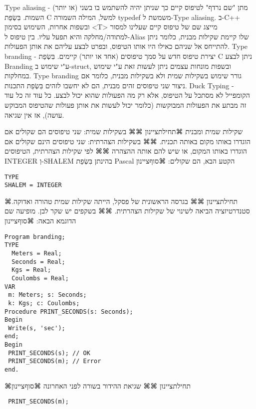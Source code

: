       Type aliasing - מתן "שם נרדף" לטיפוס קיים כך שניתן יהיה להשתמש בו בשני (או יותר) השמות. בִּשְׂפַת C למשל, המילה השמורה typedef משמשת ל-Type aliasing. ב-C++ ובשפות אחרות, השימוש בסימון <T> מייצג שם של טיפוס קיים שעלינו למסור למתודה/מחלקה והיא תפעל עליו. בין טיפוס ל-Alias שלו קיימת שקילות מבנית, כלומר ניתן להתייחס אל שניהם כאילו היו אותו הטיפוס, ובפרט לבצע עליהם את אותן הפעולות.
      Type branding - יצירת טיפוס חדש על סמך טיפוסים (אחד או יותר) קיימים. בִּשְׂפַת C ניתן לבצע Branding ע"י שימוש ב-struct, ובשפות מונחות עצמים ניתן לעשות זאת ע"י שימוש במחלקות. Type branding גורר שימוש בשקילות שמית ולא בשקילות מבנית, כלומר אם ניצור שני טיפוסים זהים מבנית, הם לא יחשבו לזהים בִּשְׂפַת התכנות.
      Duck Typing - הקומפייל לא מסתכל על הטיפוס, אלא רק מה הפעולות שהוא יכול לבצע. כל עוד זה כל עוד זה מבתע את הפעולות המבוקשות (כלומר יכול לעשות את אותן פעולות שהטיפוס המבוקש עושה), אז אין שגיאה.

      שקילות שמית ומבנית
      ⌘תחילת{ציינון}
      ⌘⌘ בשקילות שמית: שני טיפוסים הם שקולים אם הוגדרו באותו מקום באותה תכנית.
      ⌘⌘ בשקילות הצהרתית: שני טיפוסים הינם שקולים אם הוגדרו באותו המקום, או שיש להם אותה ההצהרה
      ⌘⌘ לפי שקילות הצהרתית, הטיפוסים INTEGER וְ-SHALEM בהינתן בִּשְׂפַת Pascal הקטע הבא, הם שקולים:
    ⌘סוף{ציינון}

\begin{verbatim}
TYPE
SHALEM = INTEGER
\end{verbatim}
      ⌘תחילת{ציינון}
      ⌘⌘ בגרסה הראשונית של פסקל, הייתה שקילות שמית טהורה ואדוקה. סטנדרטיזציה הביאה לשינוי של שקילות הצהרתית.
      ⌘⌘ בשקפים יש שקר לבן. מופיעה שם הדוגמא הבאה:
    ⌘סוף{ציינון}

\begin{verbatim}
Program branding;
TYPE
  Meters = Real;
  Seconds = Real;
  Kgs = Real;
  Coulombs = Real;
VAR
 m: Meters; s: Seconds;
 k: Kgs; c: Coulombs;
Procedure PRINT_SECONDS(s: Seconds);
Begin
 Write(s, 'sec');
end;
Begin
 PRINT_SECONDS(s); // OK
 PRINT_SECONDS(m); // Error
end.
\end{verbatim}

      ⌘תחילת{ציינון}
      ⌘⌘ שגיאת ההידור בשורה לפני האחרונה
    ⌘סוף{ציינון}

\begin{verbatim}
 PRINT_SECONDS(m);
\end{verbatim}


